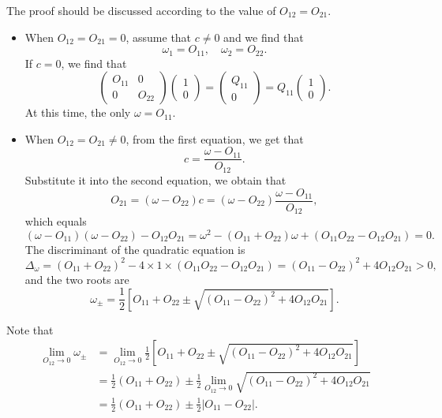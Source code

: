 \documentclass[a4paper]{book}
\newcounter{solution}[chapter]
\begin{document}
	\begin{solution}
	
	The proof should be discussed according to the value of $O_{12} = O_{21}$.
	
	\begin{itemize}
	
	\item When $O_{12} = O_{21} = 0$, assume that $c\neq 0$ and we find that
	\[
		\omega_1 = O_{11} , \quad \omega_2 = O_{22} .
	\]
	If $c=0$, we find that
	\[
		\begin{pmatrix}
			O_{11} & 0 \\ 0 & O_{22} 
		\end{pmatrix} \begin{pmatrix}
			1 \\ 0 
		\end{pmatrix} = \begin{pmatrix}
			Q_{11} \\ 0
		\end{pmatrix} = Q_{11} \begin{pmatrix}
			1 \\ 0
		\end{pmatrix} .
	\]
	At this time, the only $\omega = O_{11}$.
	
	\item When $O_{12} = O_{21} \neq 0$, from the first equation, we get that
	\[
		c = \frac{ \omega - O_{11} }{ O_{12} } .
	\]
	Substitute it into the second equation, we obtain that
	\[
		O_{21} = ( \omega - O_{22} ) c = ( \omega - O_{22} ) \frac{ \omega - O_{11} }{ O_{12} },
	\]
	which equals
	\[
		( \omega - O_{11} )( \omega - O_{22} ) - O_{12} O_{21} = \omega^2 - ( O_{11} + O_{22} ) \omega + ( O_{11} O_{22} - O_{12} O_{21} ) = 0 .
	\]	
	The discriminant of the quadratic equation is
	\[
		\Delta_\omega = ( O_{11} + O_{22} )^2 - 4 \times 1 \times ( O_{11} O_{22} - O_{12} O_{21} ) = ( O_{11} - O_{22} )^2 + 4 O_{12} O_{21} > 0 ,
	\]
	and the two roots are
	\[
		\omega_\pm = \frac{1}{2} \left[ O_{11} + O_{22} \pm \sqrt{ ( O_{11} - O_{22} )^2 + 4 O_{12} O_{21} } \right] .
	\]
	\end{itemize}
	
	Note that
	\begin{align*}
		\lim_{O_{12} \rightarrow 0} \omega_\pm &= \lim_{O_{12} \rightarrow 0} \frac{1}{2} \left[ O_{11} + O_{22} \pm \sqrt{ ( O_{11} - O_{22} )^2 + 4 O_{12} O_{21} } \right] \\
		&= \frac{1}{2} \left( O_{11} + O_{22} \right) \pm \frac{1}{2} \lim_{O_{12} \rightarrow 0} \sqrt{ ( O_{11} - O_{22} )^2 + 4 O_{12} O_{21} } \\
		&= \frac{1}{2} \left( O_{11} + O_{22} \right) \pm \frac{1}{2} | O_{11} - O_{22} | .
	\end{align*}
	

\end{solution}
\end{document}
